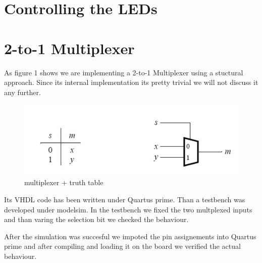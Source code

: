 \documentclass[12pt]{article}
\begin{document}

\section{ Controlling the LEDs }

\section{2-to-1 Multiplexer}
As figure 1 shows we are implementing a 2-to-1 Multiplexer using a stuctural approach. Since its internal implementation its pretty trivial we will not discuss it any further.

\begin{figure}[h]
	\centering
	\includegraphics[scale = 0.5]{image2.jpg}
	\caption{multiplexer + truth table}
\end{figure}

Its VHDL code has been written under Quartus prime. Than a testbench was developed under modelsim. In the testbench we fixed the two multplexed inputs and than varing the selection bit we checked the behaviour.

After the simulation was succesful we impoted the pin assignements into Quartus prime and after compiling and loading it on the board we verified the actual behaviour.
\\\\
\end{document}
